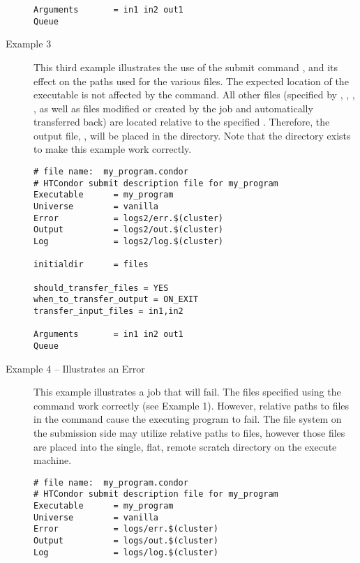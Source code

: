 \begin{description}
\begin{verbatim}
Arguments       = in1 in2 out1
Queue
\end{verbatim}
\normalsize

\item[Example 3]

This third example illustrates the use of the 
submit command , and its effect
on the paths used for the various files.
The expected location of the 
executable is not affected by the 
 command.
All other files
(specified by , , ,
,
as well as files modified or created by the job
and automatically transferred back)
are located relative to the specified .
Therefore, the output file, ,
will be placed in the \verb@files@ directory.
Note that the  directory
exists to make this example work correctly.

\footnotesize
\begin{verbatim}
# file name:  my_program.condor
# HTCondor submit description file for my_program
Executable      = my_program
Universe        = vanilla
Error           = logs2/err.$(cluster)
Output          = logs2/out.$(cluster)
Log             = logs2/log.$(cluster)

initialdir      = files

should_transfer_files = YES
when_to_transfer_output = ON_EXIT
transfer_input_files = in1,in2

Arguments       = in1 in2 out1
Queue
\end{verbatim}
\normalsize

\item[Example 4 -- Illustrates an Error]

This example illustrates a job that will fail.
The files specified using the
 command work
correctly (see Example 1).
However,
relative paths to files in the
 command
cause the executing program to fail.
The file system on the submission side may utilize
relative paths to files,
however those files are placed into the single,
flat, remote scratch directory on the execute machine.

\footnotesize
\begin{verbatim}
# file name:  my_program.condor
# HTCondor submit description file for my_program
Executable      = my_program
Universe        = vanilla
Error           = logs/err.$(cluster)
Output          = logs/out.$(cluster)
Log             = logs/log.$(cluster)


\end{verbatim}
\end{description}
